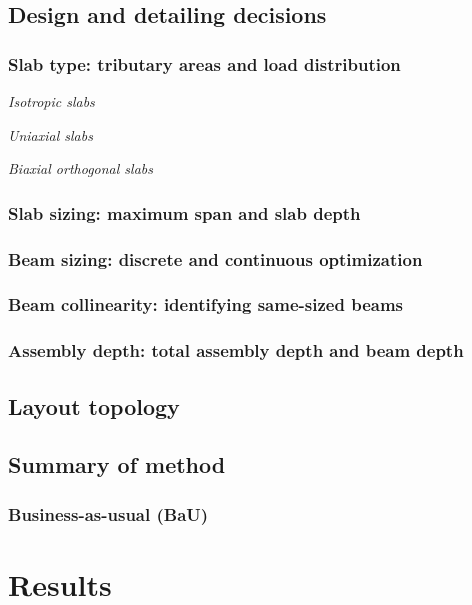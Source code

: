 \documentclass[10pt, letterpaper]{article} %
\begin{document}
    \subsection{Design and detailing decisions}\label{sec:design-decisions}

    \subsubsection{Slab type: tributary areas and load distribution}

    \textit{Isotropic slabs}

    \textit{Uniaxial slabs}

    \textit{Biaxial orthogonal slabs}

    \subsubsection{Slab sizing: maximum span and slab depth}

    \subsubsection{Beam sizing: discrete and continuous optimization}

    \subsubsection{Beam collinearity: identifying same-sized beams}

    \subsubsection{Assembly depth: total assembly depth and beam depth}

    \subsection{Layout topology}

    \subsection{Summary of method}

    \subsubsection{Business-as-usual (BaU)}

    \section{Results}\label{sec:results}
\end{document}
